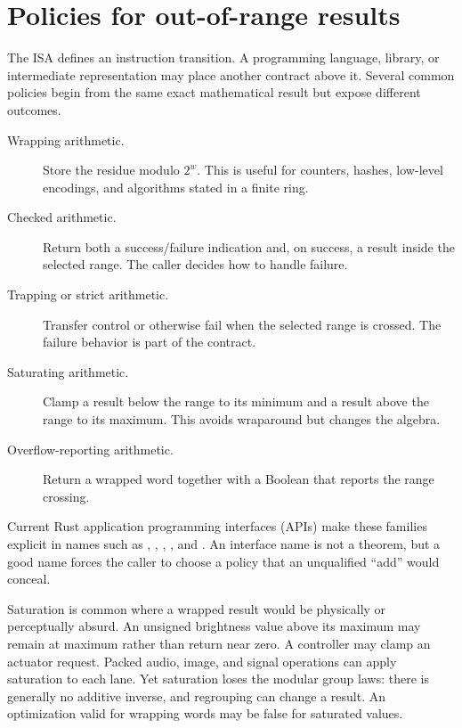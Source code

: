 \section{Policies for out-of-range results}

The ISA defines an instruction transition. A programming language, library,
or intermediate representation may place another contract above it. Several
common policies begin from the same exact mathematical result but expose
different outcomes.

\begin{description}
\item[Wrapping arithmetic.] Store the residue modulo \(2^w\). This is useful
for counters, hashes, low-level encodings, and algorithms stated in a finite
ring.
\item[Checked arithmetic.] Return both a success/failure indication and, on
success, a result inside the selected range. The caller decides how to handle failure.
\item[Trapping or strict arithmetic.] Transfer control or otherwise fail when
the selected range is crossed. The failure behavior is part of the contract.
\item[Saturating arithmetic.] Clamp a result below the range to its minimum
and a result above the range to its maximum. This avoids wraparound but changes
the algebra.
\item[Overflow-reporting arithmetic.] Return a wrapped word together with a
Boolean that reports the range crossing.
\end{description}

Current Rust application programming interfaces (APIs) make these families explicit in names such as
, , ,
, and 
\autocite{rust2026u8}. An interface name is not a theorem, but a good name forces the
caller to choose a policy that an unqualified ``add'' would conceal.

Saturation is common where a wrapped result would be physically or
perceptually absurd. An unsigned brightness value above its maximum may remain
at maximum rather than return near zero. A controller may clamp an actuator
request. Packed audio, image, and signal operations can apply saturation to
each lane. Yet saturation loses the modular group laws: there is generally no
additive inverse, and regrouping can change a result. An optimization valid
for wrapping words may be false for saturated values.

